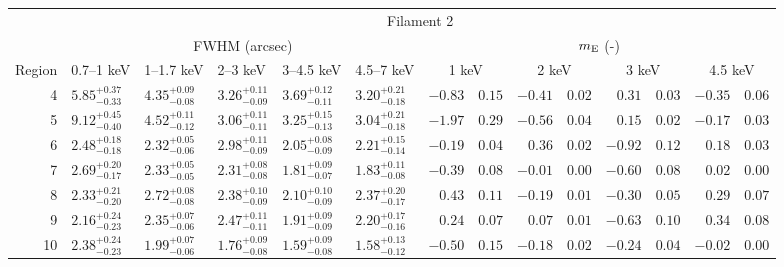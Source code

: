 \begin{tabular}{@{}rlllllr@{ $\pm$ }lr@{ $\pm$ }lr@{ $\pm$ }lr@{ $\pm$ }l@{}}
\midrule
{} & \multicolumn{13}{c}{Filament 2} \\
\cmidrule(l){2-14}
{} & \multicolumn{5}{c}{FWHM (arcsec)} & \multicolumn{8}{c}{$m_\mathrm{E}$ (-)} \\
\cmidrule(lr){2-6} \cmidrule(l){7-14}
Region & 0.7--1 keV & 1--1.7 keV & 2--3 keV & 3--4.5 keV & 4.5--7 keV
       & \multicolumn{2}{c}{1 keV} & \multicolumn{2}{c}{2 keV}
       & \multicolumn{2}{c}{3 keV} & \multicolumn{2}{c}{4.5 keV} \\
\cmidrule{1-14}
4 & ${5.85}^{+0.37}_{-0.33}$ & ${4.35}^{+0.09}_{-0.08}$ & ${3.26}^{+0.11}_{-0.09}$ & ${3.69}^{+0.12}_{-0.11}$ & ${3.20}^{+0.21}_{-0.18}$
  & $-0.83$ & $0.15$ & $-0.41$ & $0.02$ & $0.31$ & $0.03$ & $-0.35$ & $0.06$ \\
5 & ${9.12}^{+0.45}_{-0.40}$ & ${4.52}^{+0.11}_{-0.12}$ & ${3.06}^{+0.11}_{-0.11}$ & ${3.25}^{+0.15}_{-0.13}$ & ${3.04}^{+0.21}_{-0.18}$
  & $-1.97$ & $0.29$ & $-0.56$ & $0.04$ & $0.15$ & $0.02$ & $-0.17$ & $0.03$ \\
6 & ${2.48}^{+0.18}_{-0.18}$ & ${2.32}^{+0.05}_{-0.06}$ & ${2.98}^{+0.11}_{-0.09}$ & ${2.05}^{+0.08}_{-0.09}$ & ${2.21}^{+0.15}_{-0.14}$
  & $-0.19$ & $0.04$ & $0.36$ & $0.02$ & $-0.92$ & $0.12$ & $0.18$ & $0.03$ \\
7 & ${2.69}^{+0.20}_{-0.17}$ & ${2.33}^{+0.05}_{-0.05}$ & ${2.31}^{+0.08}_{-0.08}$ & ${1.81}^{+0.09}_{-0.07}$ & ${1.83}^{+0.11}_{-0.08}$
  & $-0.39$ & $0.08$ & $-0.01$ & $0.00$ & $-0.60$ & $0.08$ & $0.02$ & $0.00$ \\
8 & ${2.33}^{+0.21}_{-0.20}$ & ${2.72}^{+0.08}_{-0.08}$ & ${2.38}^{+0.10}_{-0.09}$ & ${2.10}^{+0.10}_{-0.09}$ & ${2.37}^{+0.20}_{-0.17}$
  & $0.43$ & $0.11$ & $-0.19$ & $0.01$ & $-0.30$ & $0.05$ & $0.29$ & $0.07$ \\
9 & ${2.16}^{+0.24}_{-0.23}$ & ${2.35}^{+0.07}_{-0.06}$ & ${2.47}^{+0.11}_{-0.11}$ & ${1.91}^{+0.09}_{-0.09}$ & ${2.20}^{+0.17}_{-0.16}$
  & $0.24$ & $0.07$ & $0.07$ & $0.01$ & $-0.63$ & $0.10$ & $0.34$ & $0.08$ \\
10 & ${2.38}^{+0.24}_{-0.23}$ & ${1.99}^{+0.07}_{-0.06}$ & ${1.76}^{+0.09}_{-0.08}$ & ${1.59}^{+0.09}_{-0.08}$ & ${1.58}^{+0.13}_{-0.12}$
  & $-0.50$ & $0.15$ & $-0.18$ & $0.02$ & $-0.24$ & $0.04$ & $-0.02$ & $0.00$ \\


\end{tabular}
